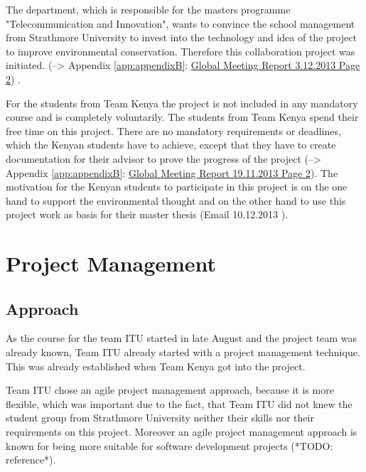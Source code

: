 The department, which is responsible for the masters programme "Telecommunication and Innovation", wants to convince the school management from Strathmore University to invest into the technology and idea of the project to improve environmental conservation. Therefore this collaboration project was initiated. (--> Appendix \ref{app:appendixB}: \hyperlink{GSD20131203.2}{Global Meeting Report 3.12.2013 Page 2}) .

For the students from Team Kenya the project is not included in any mandatory course and is completely voluntarily. The students from Team Kenya spend their free time on this project. There are no mandatory requirements or deadlines, which the Kenyan students have to achieve, except that they have to create documentation for their advisor to prove the progress of the project (--> Appendix \ref{app:appendixB}: \hyperlink{GSD20131119.2}{Global Meeting Report 19.11.2013 Page 2}). The motivation for the Kenyan students to participate in this project is on the one hand to support the environmental thought and on the other hand to use this project work as basis for their master thesis (Email 10.12.2013 ).


\section{Project Management}

\subsection{Approach}

As the course for the team ITU started in late August and the project team was already known, Team ITU already started with a project management technique. This was already established when Team Kenya got into the project.

Team ITU chose an agile project management approach, because it is more flexible, which was important due to the fact, that Team ITU did not knew the student group from Strathmore University neither their skills nor their requirements on this project. Moreover an agile project management approach is known for being more suitable for software development projects (*TODO: reference*).

